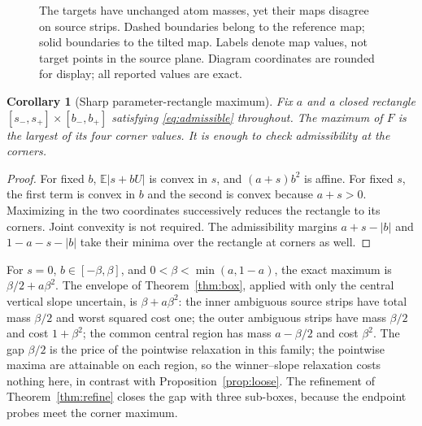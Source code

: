 \documentclass[11pt]{article}
\newtheorem{corollary}[theorem]{Corollary}
\theoremstyle{remark}
\newcommand{\E}{\mathbb E}
\begin{document}
\begin{figure}[tbp]
\centering
{}
\caption{The targets have unchanged atom masses, yet their maps disagree on
source strips. Dashed boundaries belong to the reference map; solid boundaries
to the tilted map. Labels denote map values, not target points in the source
plane. Diagram coordinates are rounded for display; all reported values are exact.}
\end{figure}

\begin{corollary}[Sharp parameter-rectangle maximum]\label{cor:corner}
Fix $a$ and a closed rectangle $[s_-,s_+]\times[b_-,b_+]$ satisfying
\eqref{eq:admissible} throughout. The maximum of $F$ is the largest of its
four corner values. It is enough to check admissibility at the corners.
\end{corollary}
\begin{proof}
For fixed $b$, $\E|s+bU|$ is convex in $s$, and $(a+s)b^2$ is affine.
For fixed $s$, the first term is convex in $b$ and the second is convex
because $a+s>0$. Maximizing in the two coordinates successively reduces
the rectangle to its corners. Joint convexity is not required. The
admissibility margins $a+s-|b|$ and $1-a-s-|b|$ take their minima over
the rectangle at corners as well.
\end{proof}

For $s=0$, $b\in[-\beta,\beta]$, and $0<\beta<\min(a,1-a)$, the exact maximum
is $\beta/2+a\beta^2$. The envelope of Theorem~\ref{thm:box}, applied with
only the central vertical slope uncertain, is $\beta+a\beta^2$: the inner
ambiguous source strips have total mass $\beta/2$ and worst squared cost one;
the outer ambiguous strips have mass $\beta/2$ and cost $1+\beta^2$; the common
central region has mass $a-\beta/2$ and cost $\beta^2$. The gap $\beta/2$ is
the price of the pointwise relaxation in this family; the pointwise maxima are
attainable on each region, so the winner--slope relaxation costs nothing here,
in contrast with Proposition~\ref{prop:loose}. The refinement of
Theorem~\ref{thm:refine} closes the gap with three sub-boxes, because the
endpoint probes meet the corner maximum.
\end{document}
